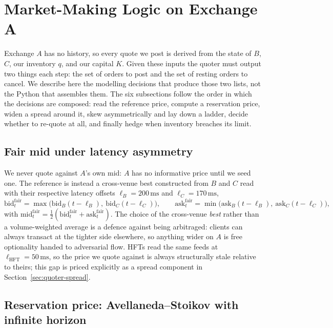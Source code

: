 \section{Market-Making Logic on Exchange A}
\label{sec:quoter}

Exchange $A$ has no history, so every quote we post is derived
from the state of $B$, $C$, our inventory $q$, and our capital $K$.
Given these inputs the quoter must output two things each step: the
set of orders to post and the set of resting orders to cancel. We
describe here the modelling decisions that produce those two lists,
not the Python that assembles them. The six subsections follow the
order in which the decisions are composed: read the reference price,
compute a reservation price, widen a spread around it, skew
asymmetrically and lay down a ladder, decide whether to re-quote at
all, and finally hedge when inventory breaches its limit.

\subsection{Fair mid under latency asymmetry}
\label{sec:quoter-mid}

We never quote against $A$'s own mid: $A$ has no informative price
until we seed one. The reference is instead a cross-venue best
constructed from $B$ and $C$ read with their respective latency
offsets $\ell_B = 200\,\mathrm{ms}$ and $\ell_C = 170\,\mathrm{ms}$,
\[
  \mathrm{bid}^{\mathrm{fair}}_t = \max\!\bigl(\mathrm{bid}_B(t{-}\ell_B),\ \mathrm{bid}_C(t{-}\ell_C)\bigr),
  \qquad
  \mathrm{ask}^{\mathrm{fair}}_t = \min\!\bigl(\mathrm{ask}_B(t{-}\ell_B),\ \mathrm{ask}_C(t{-}\ell_C)\bigr),
\]
with $\mathrm{mid}^{\mathrm{fair}}_t = \tfrac{1}{2}(\mathrm{bid}^{\mathrm{fair}}_t + \mathrm{ask}^{\mathrm{fair}}_t)$.
The choice of the cross-venue \emph{best} rather than a volume-weighted
average is a defence against being arbitraged: clients can always
transact at the tighter side elsewhere, so anything wider on $A$ is
free optionality handed to adversarial flow. HFTs read the same
feeds at $\ell_{\mathrm{HFT}} = 50\,\mathrm{ms}$, so the price we
quote against is always structurally stale relative to theirs; this
gap is priced explicitly as a spread component in
Section~\ref{sec:quoter-spread}.

\subsection{Reservation price: Avellaneda--Stoikov with infinite horizon}
\label{sec:quoter-reservation}

